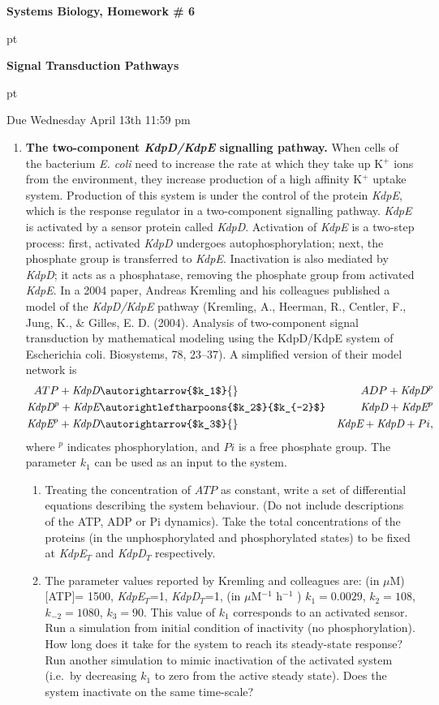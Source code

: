 \documentclass[12pt]{article}
\newcommand{\beqn}{\begin{eqnarray}}
\newcommand{\eeqn}{\end{eqnarray}}
\def \beqn {\begin{eqnarray*}}
\def \eeqn {\end{eqnarray*}}
\begin{document}
\centerline{\Large \bf Systems Biology, Homework \# 6}
 pt
\centerline{\Large \bf Signal Transduction Pathways }
 pt
\centerline{\Large  Due Wednesday April 13th 11:59 pm}

\begin{enumerate}

\item {\bf The two-component {\em KdpD/KdpE} signalling pathway.} When cells of the bacterium {\em E. coli} need to increase the rate at which they take up K$^+$ ions from the environment, they increase production of a high affinity K$^+$ uptake system.  Production of this system is under the control of the protein {\em KdpE}, which is the response regulator in a two-component signalling pathway.  {\em KdpE} is activated by a sensor protein called {\em KdpD}.   Activation of {\em KdpE} is a two-step process: first, activated {\em KdpD} undergoes autophosphorylation; next, the phosphate group is transferred to {\em KdpE}.  Inactivation is also mediated by {\em KdpD}; it acts as a phosphatase, removing the phosphate group from activated {\em KdpE}.  In a 2004 paper, Andreas Kremling and his colleagues published a model of the {\em KdpD/KdpE} pathway (Kremling, A., Heerman, R., Centler, F., Jung, K., \& Gilles, E. D. (2004). Analysis of two-component signal transduction by mathematical modeling using the KdpD/KdpE system of Escherichia coli. Biosystems, 78, 23–37).   A simplified version of their model network is
\beqn
ATP + \mbox{{\em KdpD}} &\autorightarrow{$k_1$}{}& ADP + \mbox{{\em KdpD}}^p \\
\mbox{{\em KdpD}}^p + \mbox{{\em KdpE}} &\autorightleftharpoons{$k_2$}{$k_{-2}$}& \mbox{{\em KdpD}} + \mbox{{\em KdpE}}^p \\
\mbox{{\em KdpE}}^p + \mbox{{\em KdpD}} &\autorightarrow{$k_3$}{}& \mbox{{\em KdpE}} + \mbox{{\em KdpD}}+ Pi,
\eeqn
where $^p$ indicates phosphorylation, and $Pi$ is a free phosphate group.  The parameter $k_1$ can be used as an input to the system.  

\begin{enumerate}  
\item Treating the concentration of $ATP$  as constant, write a set of differential equations describing the system behaviour. (Do not include descriptions of the ATP, ADP or Pi dynamics).  Take the total concentrations of the proteins (in the unphosphorylated and phosphorylated states) to be fixed at {\em KdpE}$_T$ and {\em KdpD}$_T$ respectively.


\item The parameter values reported by Kremling 
and colleagues are: (in $\mu$M) [ATP]= 1500, {\em KdpE}$_T$=1, {\em KdpD}$_T$=1, (in $\mu$M$^{-1}$ h$^{-1}$ ) $k_1=0.0029$, $k_2=108$, $k_{-2}=1080$, $k_3=90$.  This value of $k_1$ corresponds to an activated sensor.  Run a simulation from initial condition of inactivity (no phosphorylation).  How long does it take for  the system to reach its steady-state response?  Run another simulation to mimic inactivation of the activated system (i.e.~by decreasing $k_1$ to zero from the active steady state).  Does the system inactivate on the same time-scale?


\end{enumerate}
\end{enumerate}
\end{document}
